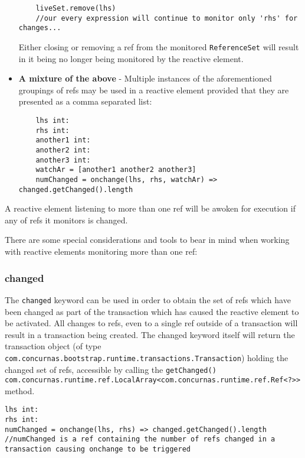 \documentclass[conc-doc]{subfiles}
\begin{document}
\begin{itemize}
\begin{lstlisting}
	liveSet.remove(lhs)
	//our every expression will continue to monitor only 'rhs' for changes...
	\end{lstlisting}
	Either closing or removing a ref from the monitored \lstinline{ReferenceSet} will result in it being no longer being monitored by the reactive element.	
	\item \textbf{A mixture of the above} - Multiple instances of the aforementioned groupings of refs may be used in a reactive element provided that they are presented as a comma separated list:
	\begin{lstlisting}
	lhs int:
	rhs int:
	another1 int:
	another2 int:
	another3 int:
	watchAr = [another1 another2 another3]
	numChanged = onchange(lhs, rhs, watchAr) => changed.getChanged().length
	\end{lstlisting}	
\end{itemize}

A reactive element listening to more than one ref will be awoken for execution if any of refs it monitors is changed. 

There are some special considerations and tools to bear in mind when working with reactive elements monitoring more than one ref:

\subsubsection{changed}
The \lstinline{changed} keyword can be used in order to obtain the set of refs which have been changed as part of the transaction which has caused the reactive element to be activated. All changes to refs, even to a single ref outside of a transaction will result in a transaction being created. The changed keyword itself will return the transaction object (of type \lstinline{com.concurnas.bootstrap.runtime.transactions.Transaction}) holding the changed set of refs, accessible by calling the \lstinline{getChanged() com.concurnas.runtime.ref.LocalArray<com.concurnas.runtime.ref.Ref<?>>} method.

\begin{lstlisting}
lhs int:
rhs int:
numChanged = onchange(lhs, rhs) => changed.getChanged().length
//numChanged is a ref containing the number of refs changed in a transaction causing onchange to be triggered
\end{lstlisting}
\end{document}
